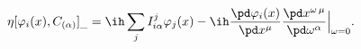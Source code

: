 \begin{equation}	\label{5.2}
\eta [\varphi_i(x) , C_{(\alpha)}]_{\_}
=
\ih \sum_{j} I_{i\alpha}^{j} \varphi_j(x)
- \ih \frac{\pd\varphi_i(x)}{\pd x^\mu}
    \frac{\pd x^{\omega\,\mu}}{\pd \omega^\alpha}\Big|_{\omega=0} .
	\end{equation}

